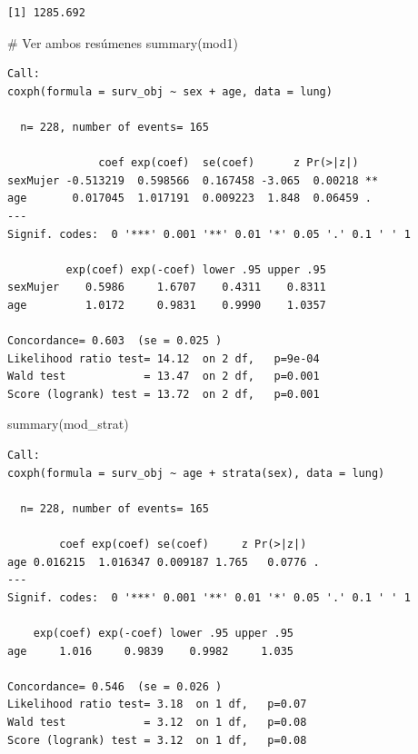 \documentclass[
]{article}
\newenvironment{Shaded}{\begin{snugshade}}{\end{snugshade}}
\newcommand{\CommentTok}[1]{\textcolor[rgb]{0.37,0.37,0.37}{#1}}
\newcommand{\FunctionTok}[1]{\textcolor[rgb]{0.28,0.35,0.67}{#1}}
\newcommand{\NormalTok}[1]{\textcolor[rgb]{0.00,0.23,0.31}{#1}}
\begin{document}
\begin{verbatim}
[1] 1285.692
\end{verbatim}

\begin{Shaded}
\begin{Highlighting}[]
\CommentTok{\# Ver ambos resúmenes}
\FunctionTok{summary}\NormalTok{(mod1)}
\end{Highlighting}
\end{Shaded}

\begin{verbatim}
Call:
coxph(formula = surv_obj ~ sex + age, data = lung)

  n= 228, number of events= 165 

              coef exp(coef)  se(coef)      z Pr(>|z|)   
sexMujer -0.513219  0.598566  0.167458 -3.065  0.00218 **
age       0.017045  1.017191  0.009223  1.848  0.06459 . 
---
Signif. codes:  0 '***' 0.001 '**' 0.01 '*' 0.05 '.' 0.1 ' ' 1

         exp(coef) exp(-coef) lower .95 upper .95
sexMujer    0.5986     1.6707    0.4311    0.8311
age         1.0172     0.9831    0.9990    1.0357

Concordance= 0.603  (se = 0.025 )
Likelihood ratio test= 14.12  on 2 df,   p=9e-04
Wald test            = 13.47  on 2 df,   p=0.001
Score (logrank) test = 13.72  on 2 df,   p=0.001
\end{verbatim}

\begin{Shaded}
\begin{Highlighting}[]
\FunctionTok{summary}\NormalTok{(mod\_strat)}
\end{Highlighting}
\end{Shaded}

\begin{verbatim}
Call:
coxph(formula = surv_obj ~ age + strata(sex), data = lung)

  n= 228, number of events= 165 

        coef exp(coef) se(coef)     z Pr(>|z|)  
age 0.016215  1.016347 0.009187 1.765   0.0776 .
---
Signif. codes:  0 '***' 0.001 '**' 0.01 '*' 0.05 '.' 0.1 ' ' 1

    exp(coef) exp(-coef) lower .95 upper .95
age     1.016     0.9839    0.9982     1.035

Concordance= 0.546  (se = 0.026 )
Likelihood ratio test= 3.18  on 1 df,   p=0.07
Wald test            = 3.12  on 1 df,   p=0.08
Score (logrank) test = 3.12  on 1 df,   p=0.08
\end{verbatim}
\end{document}
